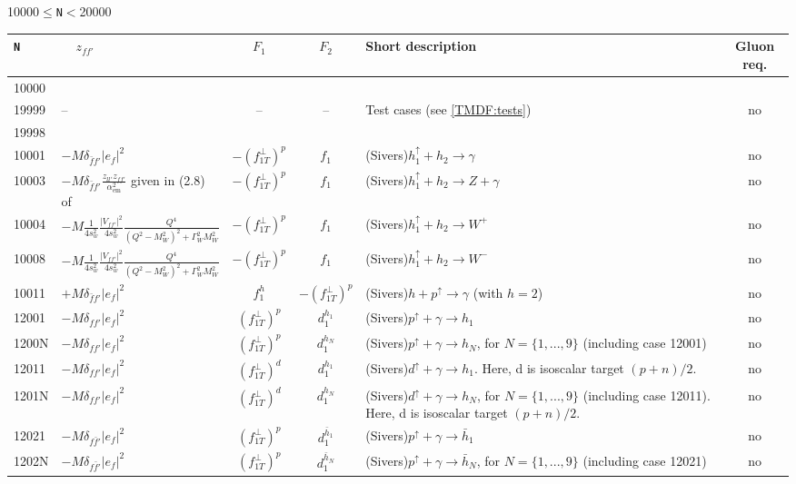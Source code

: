 \documentclass[prd,nofootinbib,eqsecnum,final]{revtex4}
\newcommand{\Ds}{\displaystyle}
\renewcommand{\(}{\left(}
\renewcommand{\)}{\right)}
\renewcommand{\[}{\left[}
\renewcommand{\]}{\right]}
\begin{document}
\begin{center}
10000$\leqslant$\texttt{N}$<$20000
\\
\begin{longtable}{||l|p{6cm}|c|c||p{7cm}|c||}
\hline\hline
\texttt{N} & ~~$z_{ff'}$~~& ~~$F_1$~~ & ~~$F_2$~~&  Short description & Gluon req. 
\\\hline
10000 &  &  &  &  & 
\\
19999 & -- & -- & -- & Test cases (see \ref{TMDF:tests}) & no
\\
19998 &  &  &  &  & 
\\\hline\hline
10001 & $-M\delta_{\bar f f'}|e_f|^2$ & $-(f_{1T}^\perp)^p$ & $f_1$ & (Sivers)$h_1^{\uparrow}+h_2\to\gamma$ & no
\\\hline
10003 & $-M\Ds\delta_{\bar f f'}\frac{z_{ll'}z_{ff'}}{\alpha_{\text{em}}^2}$ given in (2.8) of \cite{Scimemi:2017etj} & $-(f_{1T}^\perp)^p$ & $f_1$ & (Sivers)$h_1^{\uparrow}+h_2\to Z+\gamma$ & no
\\\hline
10004 & $-M\Ds \frac{1}{4s_w^2}\frac{|V_{f f'}|^2}{4s_w^2}\frac{Q^4}{(Q^2-M_W^2)^2+\Gamma_W^2M_W^2}$ & $-(f_{1T}^\perp)^p$ & $f_1$ & (Sivers)$h_1^{\uparrow}+h_2\to W^+$ & no
\\\hline
10008 & $-M\Ds \frac{1}{4s_w^2}\frac{|V_{f f'}|^2}{4s_w^2}\frac{Q^4}{(Q^2-M_W^2)^2+\Gamma_W^2M_W^2}$ & $-(f_{1T}^\perp)^p$ & $f_1$ & (Sivers)$h_1^{\uparrow}+h_2\to W^-$ & no
\\\hline
10011 & $+M\delta_{\bar f f'}|e_f|^2$ & $f^h_1$ & $-(f_{1T}^\perp)^{p}$ & (Sivers)$h+p^\uparrow\to\gamma$ (with $h=2$) & no
\\\hline \hline
12001 & $-M\delta_{ff'}|e_f|^2$~~&$(f_{1T}^\perp)^p$ & $d^{h_1}_1$ & (Sivers)$p^{\uparrow}+\gamma\to h_1$ & no
\\\hline
1200N & $-M\delta_{ff'}|e_f|^2$~~&$(f_{1T}^\perp)^p$ & $d^{h_N}_1$ & (Sivers)$p^{\uparrow}+\gamma\to h_N$, for $N=\{1,...,9\}$ (including case 12001) & no
\\\hline \hline
12011 & $-M\delta_{ff'}|e_f|^2$~~&$(f_{1T}^\perp)^{d}$ & $d^{h_1}_1$ & (Sivers)$d^{\uparrow}+\gamma\to h_1$. Here, d is isoscalar target $(p+n)/2$. & no
\\\hline
1201N & $-M\delta_{ff'}|e_f|^2$~~&$(f_{1T}^\perp)^{d}$ & $d^{h_N}_1$ & (Sivers)$d^{\uparrow}+\gamma\to h_N$, for $N=\{1,...,9\}$ (including case 12011). Here, d is isoscalar target $(p+n)/2$. & no
\\\hline \hline
12021 & $-M\delta_{f\bar f'}|e_f|^2$~~&$(f_{1T}^\perp)^p$ & $d^{\bar h_1}_1$ & (Sivers)$p^{\uparrow}+\gamma\to \bar h_1$ & no
\\\hline
1202N & $-M\delta_{f\bar f'}|e_f|^2$~~&$(f_{1T}^\perp)^p$ & $d^{\bar h_N}_1$ & (Sivers)$p^{\uparrow}+\gamma\to \bar h_N$, for $N=\{1,...,9\}$ (including case 12021) & no

\end{longtable}
\end{center}
\end{document}
